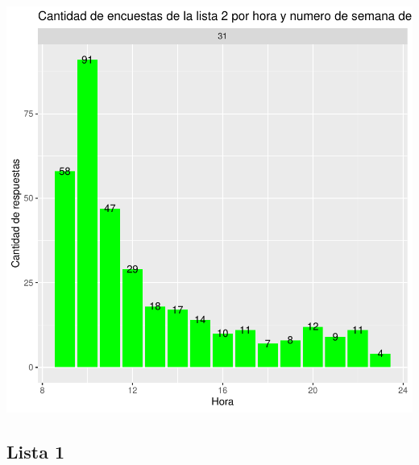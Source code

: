 \documentclass{article}
\begin{document}
\includegraphics{seguimientov5-010}

\subsection{Lista 1}
\end{document}
